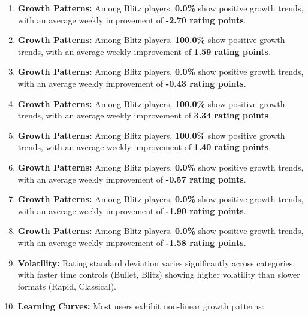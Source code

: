 \documentclass[
]{article}
\begin{document}
\begin{enumerate}
\item
  \textbf{Growth Patterns:} Among Blitz players, \textbf{0.0\%} show
  positive growth trends, with an average weekly improvement of
  \textbf{-2.70 rating points}.
\item
  \textbf{Growth Patterns:} Among Blitz players, \textbf{100.0\%} show
  positive growth trends, with an average weekly improvement of
  \textbf{1.59 rating points}.
\item
  \textbf{Growth Patterns:} Among Blitz players, \textbf{0.0\%} show
  positive growth trends, with an average weekly improvement of
  \textbf{-0.43 rating points}.
\item
  \textbf{Growth Patterns:} Among Blitz players, \textbf{100.0\%} show
  positive growth trends, with an average weekly improvement of
  \textbf{3.34 rating points}.
\item
  \textbf{Growth Patterns:} Among Blitz players, \textbf{100.0\%} show
  positive growth trends, with an average weekly improvement of
  \textbf{1.40 rating points}.
\item
  \textbf{Growth Patterns:} Among Blitz players, \textbf{0.0\%} show
  positive growth trends, with an average weekly improvement of
  \textbf{-0.57 rating points}.
\item
  \textbf{Growth Patterns:} Among Blitz players, \textbf{0.0\%} show
  positive growth trends, with an average weekly improvement of
  \textbf{-1.90 rating points}.
\item
  \textbf{Growth Patterns:} Among Blitz players, \textbf{0.0\%} show
  positive growth trends, with an average weekly improvement of
  \textbf{-1.58 rating points}.
\item
  \textbf{Volatility:} Rating standard deviation varies significantly
  across categories, with faster time controls (Bullet, Blitz) showing
  higher volatility than slower formats (Rapid, Classical).
\item
  \textbf{Learning Curves:} Most users exhibit non-linear growth
  patterns:


\end{enumerate}
\end{document}
